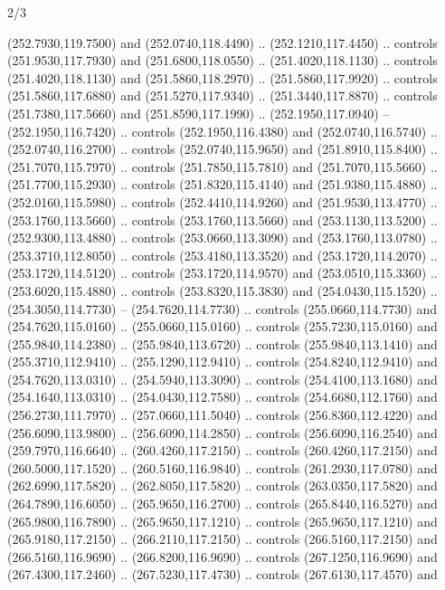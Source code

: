 \begin{flagdescription}{2/3}
\begin{scope}[xshift=0.5\flaglength,yshift=0.5\flagwidth,scale=\flagwidth/259.2]
\begin{scope}[y=0.8pt, x=0.8pt, yscale=-1,shift={(-243,-162)}]
      (252.7930,119.7500) and (252.0740,118.4490) .. (252.1210,117.4450) .. controls
      (251.9530,117.7930) and (251.6800,118.0550) .. (251.4020,118.1130) .. controls
      (251.4020,118.1130) and (251.5860,118.2970) .. (251.5860,117.9920) .. controls
      (251.5860,117.6880) and (251.5270,117.9340) .. (251.3440,117.8870) .. controls
      (251.7380,117.5660) and (251.8590,117.1990) .. (252.1950,117.0940) --
      (252.1950,116.7420) .. controls (252.1950,116.4380) and (252.0740,116.5740) ..
      (252.0740,116.2700) .. controls (252.0740,115.9650) and (251.8910,115.8400) ..
      (251.7070,115.7970) .. controls (251.7850,115.7810) and (251.7070,115.5660) ..
      (251.7700,115.2930) .. controls (251.8320,115.4140) and (251.9380,115.4880) ..
      (252.0160,115.5980) .. controls (252.4410,114.9260) and (251.9530,113.4770) ..
      (253.1760,113.5660) .. controls (253.1760,113.5660) and (253.1130,113.5200) ..
      (252.9300,113.4880) .. controls (253.0660,113.3090) and (253.1760,113.0780) ..
      (253.3710,112.8050) .. controls (253.4180,113.3520) and (253.1720,114.2070) ..
      (253.1720,114.5120) .. controls (253.1720,114.9570) and (253.0510,115.3360) ..
      (253.6020,115.4880) .. controls (253.8320,115.3830) and (254.0430,115.1520) ..
      (254.3050,114.7730) -- (254.7620,114.7730) .. controls (255.0660,114.7730) and
      (254.7620,115.0160) .. (255.0660,115.0160) .. controls (255.7230,115.0160) and
      (255.9840,114.2380) .. (255.9840,113.6720) .. controls (255.9840,113.1410) and
      (255.3710,112.9410) .. (255.1290,112.9410) .. controls (254.8240,112.9410) and
      (254.7620,113.0310) .. (254.5940,113.3090) .. controls (254.4100,113.1680) and
      (254.1640,113.0310) .. (254.0430,112.7580) .. controls (254.6680,112.1760) and
      (256.2730,111.7970) .. (257.0660,111.5040) .. controls (256.8360,112.4220) and
      (256.6090,113.9800) .. (256.6090,114.2850) .. controls (256.6090,116.2540) and
      (259.7970,116.6640) .. (260.4260,117.2150) .. controls (260.4260,117.2150) and
      (260.5000,117.1520) .. (260.5160,116.9840) .. controls (261.2930,117.0780) and
      (262.6990,117.5820) .. (262.8050,117.5820) .. controls (263.0350,117.5820) and
      (264.7890,116.6050) .. (265.9650,116.2700) .. controls (265.8440,116.5270) and
      (265.9800,116.7890) .. (265.9650,117.1210) .. controls (265.9650,117.1210) and
      (265.9180,117.2150) .. (266.2110,117.2150) .. controls (266.5160,117.2150) and
      (266.5160,116.9690) .. (266.8200,116.9690) .. controls (267.1250,116.9690) and
      (267.4300,117.2460) .. (267.5230,117.4730) .. controls (267.6130,117.4570) and

\end{scope}
\end{scope}
\end{flagdescription}
